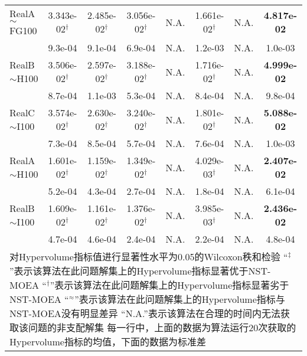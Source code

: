 {\begin{longtable}[c]{lccccccc}
    RealA$\sim$FG100      & 3.343e-02$^{\dag}$ & 2.485e-02$^{\dag}$ & 3.056e-02$^{\dag}$ & N.A.               & 1.661e-02$^{\dag}$ & N.A.                & \textbf{4.817e-02} \\
      & 9.3e-04            & 9.1e-04            & 6.9e-04            & N.A.               & 1.2e-03            & N.A.                          & 1.0e-03            \\
    \midrule
    RealB$\sim$H100      & 3.506e-02$^{\dag}$ & 2.597e-02$^{\dag}$ & 3.188e-02$^{\dag}$ & N.A.               & 1.716e-02$^{\dag}$ & N.A.                 & \textbf{4.999e-02} \\
            & 8.7e-04            & 1.1e-03            & 5.3e-04            & N.A.               & 8.4e-04            & N.A.                           & 9.8e-04            \\
    \midrule
    RealC$\sim$I100      & 3.574e-02$^{\dag}$ & 2.630e-02$^{\dag}$ & 3.240e-02$^{\dag}$ & N.A.               & 1.801e-02$^{\dag}$ & N.A.                & \textbf{5.088e-02} \\
             & 7.3e-04            & 8.5e-04            & 5.7e-04            & N.A.               & 7.6e-04            & N.A.                           & 1.0e-03            \\
    \midrule

    RealA$\sim$H100     & 1.601e-02$^{\dag}$ & 1.159e-02$^{\dag}$ & 1.349e-02$^{\dag}$ & N.A.               & 4.029e-03$^{\dag}$ & N.A.               & \textbf{2.407e-02} \\
           & 5.2e-04            & 4.3e-04            & 2.7e-04            & N.A.               & 1.8e-04            & N.A.                          & 6.1e-04            \\
    \midrule
    RealB$\sim$I100     & 1.609e-02$^{\dag}$ & 1.161e-02$^{\dag}$ & 1.376e-02$^{\dag}$ & N.A.               & 3.985e-03$^{\dag}$ & N.A.                 & \textbf{2.436e-02} \\
           & 4.7e-04            & 4.6e-04            & 2.4e-04            & N.A.               & 2.2e-04            & N.A.                      & 4.8e-04            \\
    \bottomrule
    \multicolumn{8}{p{45em}}{
        对Hypervolume指标值进行显著性水平为0.05的Wilcoxon秩和检验\vspace{-.75em}\newline{}
        “$^\ddag$”表示该算法在此问题解集上的Hypervolume指标显著优于NST-MOEA\vspace{-.75em}\newline{}
        “$^\dag$”表示该算法在此问题解集上的Hypervolume指标显著劣于NST-MOEA\vspace{-.75em}\newline{}
        “$^\approx$”表示该算法在此问题解集上的Hypervolume指标与NST-MOEA没有明显差异\vspace{-.75em}\newline{}
        “N.A.”表示该算法在合理的时间内无法获取该问题的非支配解集\vspace{-.75em}\newline{}
        每一行中，上面的数据为算法运行20次获取的Hypervolume指标的均值，下面的数据为标准差
        }
\end{longtable}
}%
